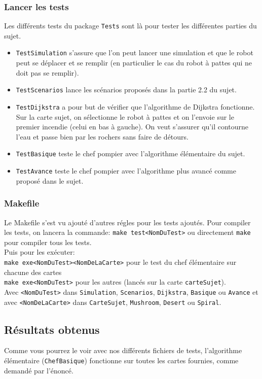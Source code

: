 \documentclass[a4paper,8pt]{article} %
\begin{document}
\subsubsection{Lancer les tests}
Les différents tests du package \texttt{Tests} sont là pour tester les différentes parties du sujet.
\begin{itemize}
    \item \texttt{TestSimulation} s'assure que l'on peut lancer une simulation et que le robot peut se déplacer et se remplir
    (en particulier le cas du robot à pattes qui ne doit pas se remplir).
    \item \texttt{TestScenarios} lance les scénarios proposés dans la partie 2.2 du sujet.
    \item \texttt{TestDijkstra} a pour but de vérifier que l'algorithme de Dijkstra fonctionne. Sur la carte sujet, 
    on sélectionne le robot à pattes et on l'envoie sur le premier incendie (celui en bas à gauche).
    On veut s'assurer qu'il contourne l'eau et passe bien par les rochers sans faire de détours.
    \item \texttt{TestBasique} teste le chef pompier avec l'algorithme élémentaire du sujet.
    \item \texttt{TestAvance} teste le chef pompier avec l'algorithme plus avancé comme proposé dans le sujet.
\end{itemize}

\subsubsection{Makefile}
Le Makefile s'est vu ajouté d'autres régles pour les tests ajoutés.
Pour compiler les tests, on lancera la commande: \texttt{make test<NomDuTest>} ou directement \texttt{make} pour compiler tous les tests. \\

Puis pour les exécuter: \\
\texttt{make exe<NomDuTest><NomDeLaCarte>} pour le test du chef élémentaire sur chacune des cartes\\
\texttt{make exe<NomDuTest>} pour les autres (lancés sur la carte \texttt{carteSujet}).\\

Avec \texttt{<NomDuTest>} dans \texttt{Simulation}, \texttt{Scenarios}, \texttt{Dijkstra}, \texttt{Basique} ou \texttt{Avance} et avec 
\texttt{<NomDeLaCarte>} dans \texttt{CarteSujet}, \texttt{Mushroom}, \texttt{Desert} ou \texttt{Spiral}.

\subsection{Résultats obtenus}
Comme vous pourrez le voir avec nos différents fichiers de tests, l'algorithme élémentaire (\texttt{ChefBasique}) fonctionne sur toutes les cartes 
fournies, comme demandé par l'énoncé.
\end{document}
